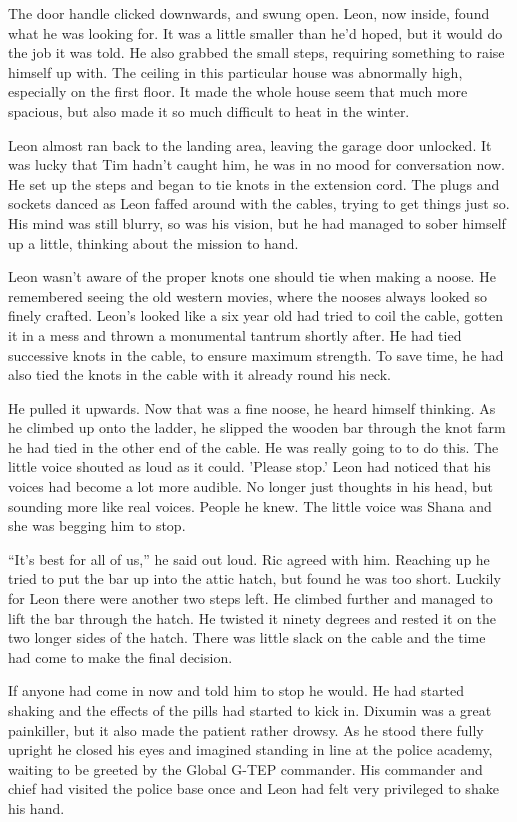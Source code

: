 The door handle clicked downwards, and swung open.  Leon, now inside, found what he was looking for.  It was a little smaller than he'd hoped, but it would do the job it was told.  He also grabbed the small steps, requiring something to raise himself up with.  The ceiling in this particular house was abnormally high, especially on the first floor.  It made the whole house seem that much more spacious, but also made it so much difficult to heat in the winter.

Leon almost ran back to the landing area, leaving the garage door unlocked.  It was lucky that Tim hadn't caught him, he was in no mood for conversation now.  He set up the steps and began to tie knots in the extension cord.  The plugs and sockets danced as Leon faffed around with the cables, trying to get things just so.  His mind was still blurry, so was his vision, but he had managed to sober himself up a little, thinking about the mission to hand.  

Leon wasn't aware of the proper knots one should tie when making a noose.  He remembered seeing the old western movies, where the nooses always looked so finely crafted.  Leon's looked like a six year old had tried to coil the cable, gotten it in a mess and thrown a monumental tantrum shortly after.  He had tied successive knots in the cable, to ensure maximum strength.  To save time, he had also tied the knots in the cable with it already round his neck.

He pulled it upwards. Now that was a fine noose, he heard himself thinking.  As he climbed up onto the ladder, he slipped the wooden bar through the knot farm he had tied in the other end of the cable.  He was really going to to do this.  The little voice shouted as loud as it could.  'Please stop.'  Leon had noticed that his voices had become a lot more audible.  No longer just thoughts in his head, but sounding more like real voices.  People he knew.  The little voice was Shana and she was begging him to stop.  

``It's best for all of us,'' he said out loud.  Ric agreed with him.  Reaching up he tried to put the bar up into the attic hatch, but found he was too short.  Luckily for Leon there were another two steps left.  He climbed further and managed to lift the bar through the hatch.  He twisted it ninety degrees and rested it on the two longer sides of the hatch.  There was little slack on the cable and the time had come to make the final decision.

If anyone had come in now and told him to stop he would.  He had started shaking and the effects of the pills had started to kick in.  Dixumin was a great painkiller, but it also made the patient rather drowsy.  As he stood there fully upright he closed his eyes and imagined standing in line at the police academy, waiting to be greeted by the Global G-TEP commander.  His commander and chief had visited the police base once and Leon had felt very privileged to shake his hand.  

